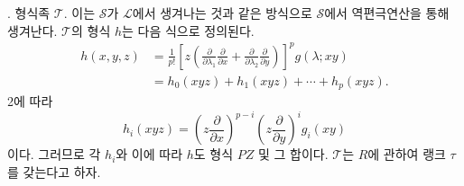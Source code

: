 
. 형식족 $\mathcal T$. 이는 $\mathcal S$가 $\mathcal L$에서 생겨나는 것과 같은 방식으로 $\mathcal S$에서 역편극연산을 통해 생겨난다. $\mathcal T$의 형식 $h$는 다음 식으로 정의된다.
\[
\begin{aligned}
 h(x,y,z)
 &=\frac1{p!}\left[z\left(\frac{\partial}{\partial\lambda_1}\frac{\partial}{\partial x}
 +\frac{\partial}{\partial\lambda_2}\frac{\partial}{\partial y}\right)\right]^p g(\lambda;xy)\\
 &=h_0(xyz)+h_1(xyz)+\cdots+h_p(xyz).
\end{aligned}
\]
2에 따라
\[
  h_i(xyz)=
  \left(z\frac{\partial}{\partial x}\right)^{p-i}
  \left(z\frac{\partial}{\partial y}\right)^i g_i(xy)
\]
이다. 그러므로 각 $h_i$와 이에 따라 $h$도 형식 $PZ$ 및 그 합이다. $\mathcal T$는 $R$에 관하여 랭크 $\tau$를 갖는다고 하자.
